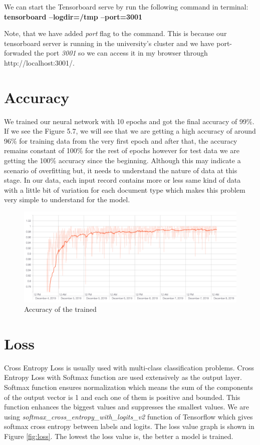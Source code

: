 We can start the Tensorboard serve by run the following command in terminal:
\newline
\textbf{tensorboard --logdir=/tmp --port=3001}
\newline

Note, that we have added \textit{port} flag to the command. This is because our tensorboard server is running in the university's cluster and we have port-forwaded the port \textit{3001} so we can access it in my browser through http://localhost:3001/.

\section{Accuracy}
We trained our neural network with 10 epochs and got the final accuracy of 99\%. If we see the Figure 5.7, we will see that we are getting a high accuracy of around 96\% for training data from the very first epoch and after that, the accuracy remains constant of 100\% for the rest of epochs however for test data we are getting the 100\% accuracy since the beginning. Although this may indicate a scenario of overfitting but, it needs to understand the nature of data at this stage. In our data, each input record contains more or less same kind of data with a little bit of variation for each document type which makes this problem very simple to understand for the model.
\begin{figure}[H]
  \centering
  \includegraphics[scale=0.40]{images/Chapter5/accuracy.png}
  \caption{Accuracy of the trained }
  \label{fig:accuracy}
\end{figure}

\section{Loss}
Cross Entropy Loss is usually used with multi-class classification problems. Cross Entropy Loss with Softmax function are used extensively as the output layer. Softmax function ensures normalization which means the sum of the components of the output vector is 1 and each one of them is positive and bounded. This function enhances the biggest values and suppresses the smallest values. We are using \textit{softmax\_cross\_entropy\_with\_logits\_v2} function of Tensorflow which gives softmax cross entropy between labels and logits. The loss value graph is shown in Figure \ref{fig:loss}. The lowest the loss value is, the better a model is trained.


